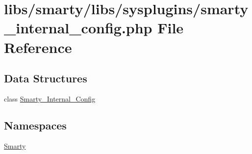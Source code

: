 \hypertarget{smarty__internal__config_8php}{}\section{libs/smarty/libs/sysplugins/smarty\+\_\+internal\+\_\+config.php File Reference}
\label{smarty__internal__config_8php}
\subsection*{Data Structures}
\begin{DoxyCompactItemize}
\item 
class \hyperlink{class_smarty___internal___config}{Smarty\+\_\+\+Internal\+\_\+\+Config}
\end{DoxyCompactItemize}
\subsection*{Namespaces}
\begin{DoxyCompactItemize}
\item 
 \hyperlink{namespace_smarty}{Smarty}
\end{DoxyCompactItemize}
